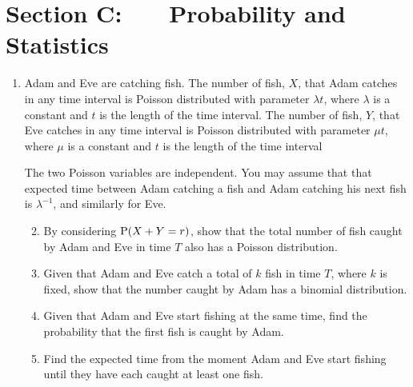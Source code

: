 \documentclass[a4, 11pt]{report}
\newlength{\qspace}
\newcounter{qnumber}
\newenvironment{question}%
 {\vspace{\qspace}
  \begin{enumerate}[\bfseries 1\quad][10]%
    \setcounter{enumi}{\value{qnumber}}%
    \item%
 }
{
  \end{enumerate}
  \filbreak
  \stepcounter{qnumber}
 }
\newenvironment{questionparts}[1][1]%
 {
  \begin{enumerate}[\bfseries (i)]%
    \setcounter{enumii}{#1}
    \addtocounter{enumii}{-1}
    \setlength{\itemsep}{2mm}
    \setlength{\parskip}{5pt}
 }
 {
  \end{enumerate}
 }
\def\P{{\rm P}}
\begin{document}
\newpage
\section*{Section C: \ \ \ Probability and Statistics}

\begin{question}

Adam 
and Eve are
catching fish. 
The number of fish, $X$,
that Adam catches in any time interval is Poisson distributed
with parameter $\lambda t$, where $\lambda$ is a constant and $t$ is the
length of the time interval.
The number of fish, $Y$,
that Eve catches in any time interval is Poisson distributed
with parameter $\mu t$, where $\mu$ is a constant and $t$ is the
length of the time interval


The two Poisson variables are independent.
You may assume that 
that expected time between 
Adam catching a fish and Adam catching his next fish is $\lambda^{-1}$,
and similarly for Eve.
\begin{questionparts}
\item
By considering $\P( X + Y = r)$, show that the total number of fish caught 
by Adam and Eve in time $T$ also has a Poisson distribution.
\item
Given that Adam and Eve catch a
total of $k$ fish in time $T$, 
where $k$ is fixed, show that the number caught by 
Adam has a binomial distribution.
\item
Given that 
Adam and Eve start fishing at the same time, find
the probability that the first fish is caught by Adam.
\item
Find the expected time from the moment Adam and Eve 
start fishing until they have each caught at least one fish.

\end{questionparts}

\end{question}
 
\end{document}

